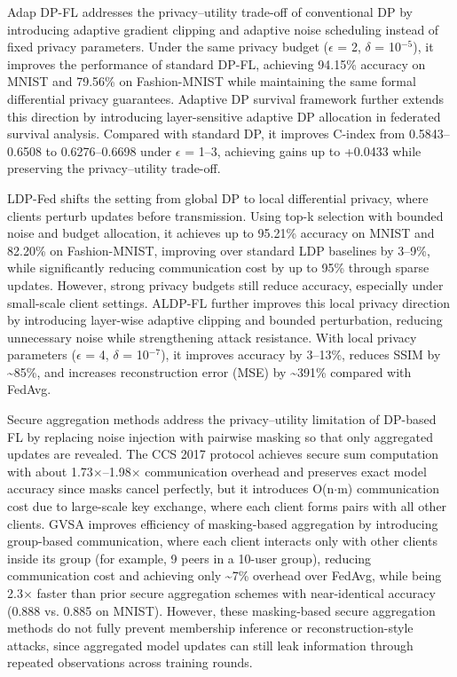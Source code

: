 \documentclass[a4paper,fleqn]{cas-dc}
\begin{document}
Adap DP-FL \citep{fu2022adap} addresses the privacy--utility trade-off of conventional DP by introducing adaptive gradient clipping and adaptive noise scheduling instead of fixed privacy parameters. Under the same privacy budget ($\epsilon$ = 2, $\delta$ = 10$^{-5}$), it improves the performance of standard DP-FL, achieving 94.15\% accuracy on MNIST and 79.56\% on Fashion-MNIST while maintaining the same formal differential privacy guarantees. Adaptive DP survival framework \citep{niu2025adaptive} further extends this direction by introducing layer-sensitive adaptive DP allocation in federated survival analysis. Compared with standard DP, it improves C-index from 0.5843--0.6508 to 0.6276--0.6698 under $\epsilon$ = 1--3, achieving gains up to +0.0433 while preserving the privacy--utility trade-off.

LDP-Fed \citep{truex2020ldp} shifts the setting from global DP to local differential privacy, where clients perturb updates before transmission. Using top-k selection with bounded noise and budget allocation, it achieves up to 95.21\% accuracy on MNIST and 82.20\% on Fashion-MNIST, improving over standard LDP baselines by 3--9\%, while significantly reducing communication cost by up to 95\% through sparse updates. However, strong privacy budgets still reduce accuracy, especially under small-scale client settings. ALDP-FL \citep{cui2025aldp} further improves this local privacy direction by introducing layer-wise adaptive clipping and bounded perturbation, reducing unnecessary noise while strengthening attack resistance. With local privacy parameters ($\epsilon$ = 4, $\delta$ = 10$^{-7}$), it improves accuracy by 3--13\%, reduces SSIM by \textasciitilde85\%, and increases reconstruction error (MSE) by \textasciitilde391\% compared with FedAvg.

Secure aggregation methods \citep{bonawitz2017practical} address the privacy--utility limitation of DP-based FL by replacing noise injection with pairwise masking so that only aggregated updates are revealed. The CCS 2017 protocol achieves secure sum computation with about 1.73$\times$--1.98$\times$ communication overhead and preserves exact model accuracy since masks cancel perfectly, but it introduces O(n$\cdot$m) communication cost due to large-scale key exchange, where each client forms pairs with all other clients. GVSA \citep{zhou2025group} improves efficiency of masking-based aggregation by introducing group-based communication, where each client interacts only with other clients inside its group (for example, 9 peers in a 10-user group), reducing communication cost and achieving only \textasciitilde7\% overhead over FedAvg, while being 2.3$\times$ faster than prior secure aggregation schemes with near-identical accuracy (0.888 vs. 0.885 on MNIST). However, these masking-based secure aggregation methods do not fully prevent membership inference or reconstruction-style attacks, since aggregated model updates can still leak information through repeated observations across training rounds.
\end{document}
